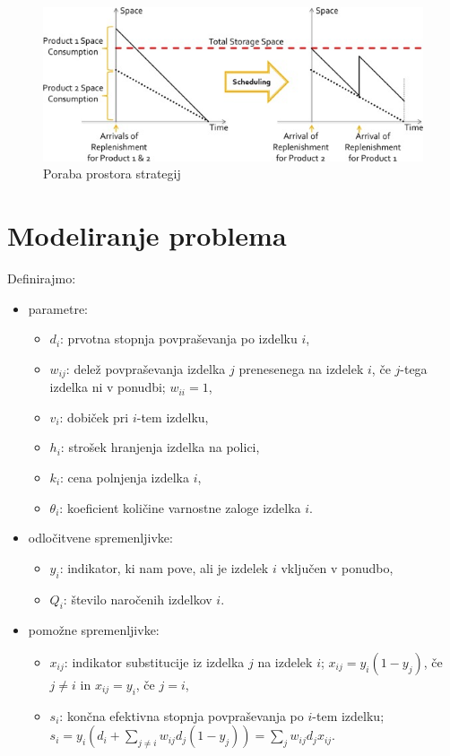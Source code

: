\documentclass[a4paper]{article}
\begin{document}
\begin{figure}[ht]
\includegraphics [scale = 0.8]{primerjava-strategij}
\caption{Poraba prostora strategij}
\end{figure}


\section{Modeliranje problema}



Definirajmo:
\begin{itemize}
\item parametre:
\begin{itemize}
\item $ d_i $: prvotna stopnja povpraševanja po izdelku $i$,
\item $ w_{ij}$: delež povpraševanja izdelka $j$ prenesenega na izdelek $i$, če $j$-tega izdelka ni v ponudbi; $w_{ii} = 1$,
\item $ v_i $: dobiček pri $i$-tem izdelku,
\item $ h_i $: strošek hranjenja izdelka na polici,
\item $ k_i $: cena polnjenja izdelka $i$, 
\item $ \theta_i $: koeficient količine varnostne zaloge izdelka $i$.
\end{itemize}

\item odločitvene spremenljivke:
\begin{itemize}
\item $ y_i $: indikator, ki nam pove, ali je izdelek $i$ vključen v ponudbo,
\item $ Q_i $: število naročenih izdelkov $i$.
\end{itemize}

\item pomožne spremenljivke:
\begin{itemize}
\item $ x_{ij} $: indikator substitucije iz izdelka $j$ na izdelek $i$; $x_{ij} = y_i (1-y_j)$, če $j \ne i$ in $x_{ij} = y_i$, če  $j = i$,
\item $ s_i $: končna efektivna stopnja povpraševanja po $i$-tem izdelku; $s_i = y_i (d_i + \sum_{j \ne i} w_{ij} d_j (1-y_j)) = \sum_j  w_{ij} d_j x_{ij}.$
\end{itemize} 
\end{itemize}
\end{document}
